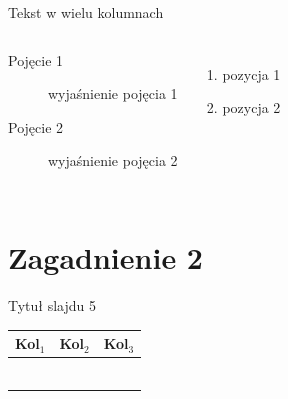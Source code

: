 \documentclass[polish,xcolor=table,9pt,aspectratio=1610,hyperref={pdfpagemode=FullScreen}]{beamer}
\begin{document}
\begin{frame}{Tekst w wielu kolumnach}
\begin{columns}
\begin{description}
\item[Pojęcie 1] \pauza wyjaśnienie pojęcia 1
\item[Pojęcie 2] \pauza wyjaśnienie pojęcia 2
\end{description}

\begin{enumerate}
\item pozycja 1
\item pozycja 2
\end{enumerate}
\end{columns}
\end{frame}

\section{Zagadnienie 2}

\begin{frame}{Tytuł slajdu 5}
\begin{table}
\begin{tabular}{|r|p{4cm}|l|}\hline
\textbf{Kol$_{1}$} &\textbf{Kol$_{2}$} &\textbf{Kol$_{3}$}\\
\hline
\hline
& & \\
& & \\
& & \\
& & \\
& & \\
& & \\
\hline
\end{tabular}
\end{table}
\end{frame}

\end{document}
